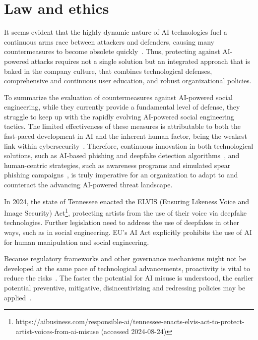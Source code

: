 \section{Law and ethics}
\begin{comment}    
    - Deepfake content detection
    - Spear phishing detection
\end{comment}



It seems evident that the highly dynamic nature of AI technologies fuel a continuous arms race between attackers and defenders, causing many countermeasures to become obsolete quickly~\citep{fakhouri_AI_Driven_Solutions_SE_Attacks_2024}. Thus, protecting against AI-powered attacks requires not a single solution but an integrated approach that is baked in the company culture, that combines technological defenses, comprehensive and continuous user education, and robust organizational policies.

To summarize the evaluation of countermeasures against AI-powered social engineering, while they currently provide a fundamental level of defense, they struggle to keep up with the rapidly evolving AI-powered social engineering tactics. The limited effectiveness of these measures is attributable to both the fast-paced development in AI and the inherent human factor, being the weakest link within cybersecurity~\citep{mitnick_The_Art_of_Deception_2003}. Therefore, continuous innovation in both technological solutions, such as AI-based phishing and deepfake detection algorithms~\citep{mirsky_Creation_Detection_Deepfakes_2021}, and human-centric strategies, such as awareness programs and simulated spear phishing campaigns~\citep{salahdineSocialEngineeringAttacks2019}, is truly imperative for an organization to adapt to and counteract the advancing AI-powered threat landscape.

In 2024, the state of Tennessee enacted the ELVIS (Ensuring Likeness Voice and Image Security) Act\footnote{https://aibusiness.com/responsible-ai/tennessee-enacts-elvis-act-to-protect-artist-voices-from-ai-misuse (accessed 2024-08-24)}, protecting artists from the use of their voice via deepfake technologies. Further legislation need to address the use of deepfakes in other ways, such as in social engineering. EU's AI Act explicitly prohibits the use of AI for human  manipulation and social engineering.

Because regulatory frameworks and other governance mechanisms might not be developed at the same pace of technological advancements, proactivity is vital to reduce the risks~\citep{blauth_AI_Crime_Overview_Malicious_Use_Abuse_2022}. The faster the potential for AI misuse is understood, the earlier potential preventive, mitigative, disincentivizing and redressing policies may be applied~\citep{king_AI_Crime_Interdisciplinary_Analysis_2019}.